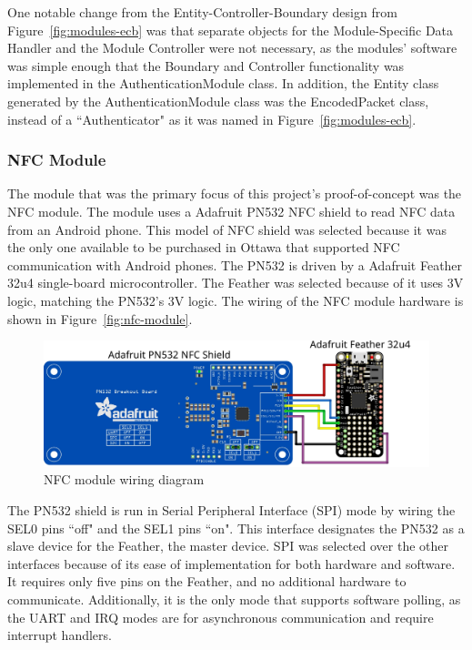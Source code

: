 \documentclass[12pt]{report}
\let\Oldsubsubsection\subsubsection
\renewcommand{\subsubsection}{\FloatBarrier\Oldsubsubsection}
\begin{document}
One notable change from the Entity-Controller-Boundary design from Figure~\ref{fig:modules-ecb} was that separate 
objects for the Module-Specific Data Handler and the Module Controller were not necessary, as the modules' software was 
simple enough that the Boundary and Controller functionality was implemented in the AuthenticationModule class. In 
addition, the Entity class generated by the AuthenticationModule class was the EncodedPacket class, instead of a 
``Authenticator" as it was named in Figure~\ref{fig:modules-ecb}.

\subsubsection{NFC Module} \label{nfc-modules}

The module that was the primary focus of this project's proof-of-concept was the NFC module. The module uses a Adafruit 
PN532 NFC shield to read NFC data from an Android phone. This model of NFC shield was selected because it was the only 
one available to be purchased in Ottawa that supported NFC communication with Android phones. The PN532 is driven by a 
Adafruit Feather 32u4 single-board microcontroller. The Feather was selected because of it uses 3V logic, matching the 
PN532's 3V logic. The wiring of the NFC module hardware is shown in Figure~\ref{fig:nfc-module}.

\begin{figure}
    \includegraphics[width=\textwidth]{Diagrams/Hardware-Diagrams/nfc_module}
    \caption{NFC module wiring diagram}
    \label{fig:nfc-module-wiring}
\end{figure}

The PN532 shield is run in Serial Peripheral Interface (SPI) mode by wiring the SEL0 pins ``off" and the SEL1 pins 
``on". This interface designates the PN532 as a slave device for the Feather, the master device. SPI was selected over 
the other interfaces because of its ease of implementation for both hardware and software. It requires only five pins on 
the Feather, and no additional hardware to communicate. Additionally, it is the only mode that supports software 
polling, as the UART and IRQ modes are for asynchronous communication and require interrupt handlers.
\end{document}
